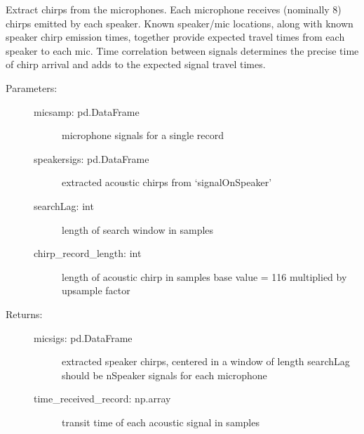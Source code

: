 \documentclass[letterpaper,10pt,english]{sphinxmanual}
\begin{document}
\begin{fulllineitems}
\label{\detokenize{code:ATom.atom_functions.signalOnMic}}
Extract chirps from the microphones. Each microphone receives
(nominally 8) chirps emitted by each speaker. Known speaker/mic locations,
along with known speaker chirp emission times, together provide
expected travel times from each speaker to each mic. Time correlation
between signals determines the precise time of chirp arrival and adds
to the expected signal travel times.
\begin{description}
\item[{Parameters:}] \leavevmode\begin{description}
\item[{micsamp: pd.DataFrame}] \leavevmode
microphone signals for a single record

\item[{speakersigs: pd.DataFrame}] \leavevmode
extracted acoustic chirps from ‘signalOnSpeaker’

\item[{searchLag: int}] \leavevmode
length of search window in samples

\item[{chirp\_record\_length: int}] \leavevmode
length of acoustic chirp in samples
base value = 116
multiplied by upsample factor

\end{description}

\item[{Returns:}] \leavevmode\begin{description}
\item[{micsigs: pd.DataFrame}] \leavevmode
extracted speaker chirps, centered in a window of length searchLag
should be nSpeaker signals for each microphone

\item[{time\_received\_record: np.array}] \leavevmode
transit time of each acoustic signal in samples

\end{description}

\end{description}

\end{fulllineitems}

\end{document}
